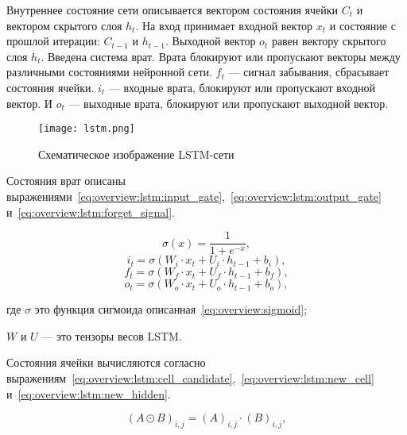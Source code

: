 Внутреннее состояние сети описывается вектором состояния ячейки $C_t$ и вектором скрытого слоя $h_t$. На вход принимает входной вектор $x_t$ и состояние с прошлой итерации: $C_{t-1}$ и $h_{t-1}$. Выходной вектор $o_t$ равен вектору скрытого слоя $h_t$. Введена система врат. Врата блокируют или пропускают векторы между различными состояниями нейронной сети. $f_{t}$ --- сигнал забывания, сбрасывает состояния ячейки. $i_{t}$ --- входные врата, блокируют или пропускают входной вектор. И $o_t$ --- выходные врата, блокируют или пропускают выходной вектор\cite{LSTM}.

\begin{figure}[h]
  \begin{center}
    \texttt{[image: lstm.png]}
    \caption{Схематическое изображение LSTM-сети\cite{LSTM}}\label{fig:overview:lstm}
  \end{center}
\end{figure}

Состояния врат описаны выражениями~\ref{eq:overview:lstm:input_gate},~\ref{eq:overview:lstm:output_gate} и~\ref{eq:overview:lstm:forget_signal}.

\begin{equation}
  \label{eq:overview:sigmoid}
  \sigma(x) = \frac{1}{1 + e^{-x}},
\end{equation}
\begin{equation}
  \label{eq:overview:lstm:input_gate}
  i_t = \sigma(W_{i}\cdot{x_t} + U_{i}\cdot{h_{t-1}} + b_i),
\end{equation}
\begin{equation}
  \label{eq:overview:lstm:forget_signal}
  f_t = \sigma(W_{f}\cdot{x_t} + U_{f}\cdot{h_{t-1}} + b_f),
\end{equation}
\begin{equation}
  \label{eq:overview:lstm:output_gate}
  o_t = \sigma(W_{o}\cdot{x_t} + U_{o}\cdot{h_{t-1}} + b_o),
\end{equation}
\begin{explanationx}
\item [где] $\sigma$ это функция сигмоида описанная~\ref{eq:overview:sigmoid};
\item $W$ и $U$ --- это тензоры весов LSTM\@.
\end{explanationx}

Состояния ячейки вычисляются согласно выражениям~\ref{eq:overview:lstm:cell_candidate},~\ref{eq:overview:lstm:new_cell} и~\ref{eq:overview:lstm:new_hidden}.

\begin{equation}
  \label{eq:overview:hadamar}
  {(A\odot{B})}_{i,j} = {(A)}_{i,j}\cdot{{(B)}_{i,j}},
\end{equation}

